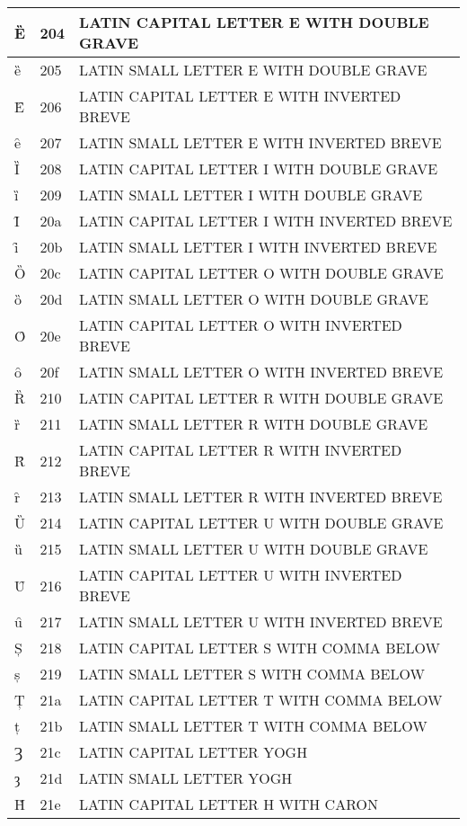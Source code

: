 \documentclass[12pt,letterpaper,openany]{book}
\begin{document}
\begin{center}
\begin{supertabular}{|m{0.25in}|m{0.5in}|m{4in}|}
Ȅ & 204 & LATIN CAPITAL LETTER E WITH DOUBLE GRAVE\\\hline
ȅ & 205 & LATIN SMALL LETTER E WITH DOUBLE GRAVE\\\hline
Ȇ & 206 & LATIN CAPITAL LETTER E WITH INVERTED BREVE\\\hline
ȇ & 207 & LATIN SMALL LETTER E WITH INVERTED BREVE\\\hline
Ȉ & 208 & LATIN CAPITAL LETTER I WITH DOUBLE GRAVE\\\hline
ȉ & 209 & LATIN SMALL LETTER I WITH DOUBLE GRAVE\\\hline
Ȋ & 20a & LATIN CAPITAL LETTER I WITH INVERTED BREVE\\\hline
ȋ & 20b & LATIN SMALL LETTER I WITH INVERTED BREVE\\\hline
Ȍ & 20c & LATIN CAPITAL LETTER O WITH DOUBLE GRAVE\\\hline
ȍ & 20d & LATIN SMALL LETTER O WITH DOUBLE GRAVE\\\hline
Ȏ & 20e & LATIN CAPITAL LETTER O WITH INVERTED BREVE\\\hline
ȏ & 20f & LATIN SMALL LETTER O WITH INVERTED BREVE\\\hline
Ȑ & 210 & LATIN CAPITAL LETTER R WITH DOUBLE GRAVE\\\hline
ȑ & 211 & LATIN SMALL LETTER R WITH DOUBLE GRAVE\\\hline
Ȓ & 212 & LATIN CAPITAL LETTER R WITH INVERTED BREVE\\\hline
ȓ & 213 & LATIN SMALL LETTER R WITH INVERTED BREVE\\\hline
Ȕ & 214 & LATIN CAPITAL LETTER U WITH DOUBLE GRAVE\\\hline
ȕ & 215 & LATIN SMALL LETTER U WITH DOUBLE GRAVE\\\hline
Ȗ & 216 & LATIN CAPITAL LETTER U WITH INVERTED BREVE\\\hline
ȗ & 217 & LATIN SMALL LETTER U WITH INVERTED BREVE\\\hline
Ș & 218 & LATIN CAPITAL LETTER S WITH COMMA BELOW\\\hline
ș & 219 & LATIN SMALL LETTER S WITH COMMA BELOW\\\hline
Ț & 21a & LATIN CAPITAL LETTER T WITH COMMA BELOW\\\hline
ț & 21b & LATIN SMALL LETTER T WITH COMMA BELOW\\\hline
Ȝ & 21c & LATIN CAPITAL LETTER YOGH\\\hline
ȝ & 21d & LATIN SMALL LETTER YOGH\\\hline
Ȟ & 21e & LATIN CAPITAL LETTER H WITH CARON\\\hline

\end{supertabular}
\end{center}
\end{document}
